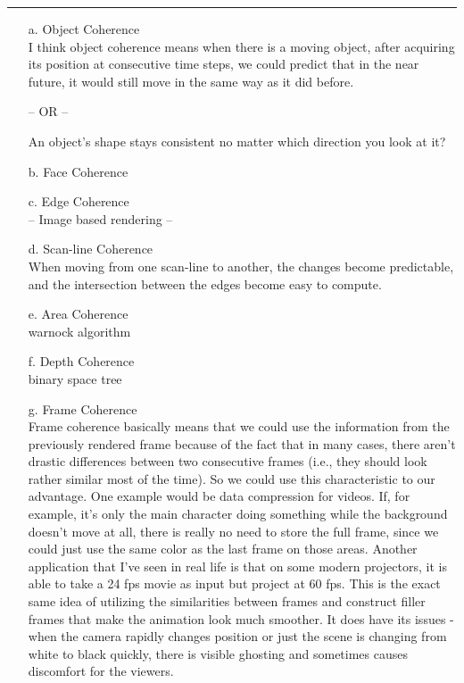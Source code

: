\documentclass[12pt]{article}
\begin{document}
\bigskip
\hrule
\bigskip
\begin{enumerate}
	\item[a.]{Object Coherence}\\
		I think object coherence means when there is a moving object, after acquiring its position at 
		consecutive time steps, we could predict that in the near future, it would still move in the same 
		way as it did before.\par
		-- OR -- \par
		An object's shape stays consistent no matter which direction you look at it?
	\item[b.]{Face Coherence}\\

	\item[c.]{Edge Coherence}\\
	--
	Image based rendering
	--
	\item[d.]{Scan-line Coherence}\\
		When moving from one scan-line to another, the changes become predictable, and the intersection
		between the edges become easy to compute.
	\item[e.]{Area Coherence}\\
	warnock algorithm
	\item[f.]{Depth Coherence}\\
	binary space tree
	\item[g.]{Frame Coherence}\\
		Frame coherence basically means that we could use the information from the previously rendered
		frame because of the fact that in many cases, there aren't drastic differences between two 
		consecutive frames (i.e., they should look rather similar most of the time). So we could use
		this characteristic to our advantage. One example would be data compression for videos. If, for
		example, it's only the main character doing something while the background doesn't move at all,
		there is really no need to store the full frame, since we could just use the same color as the 
		last frame on those areas. Another application that I've seen in real life is that on some 
		modern projectors, it is able to take a 24 fps movie as input but project at 60 fps. This is 
		the exact same idea of utilizing the similarities between frames and construct filler frames 
		that make the animation look much smoother. It does have its issues -  when the camera rapidly
		changes position or just the scene is changing from white to black quickly, there is visible 
		ghosting and sometimes causes discomfort for the viewers.
\end{enumerate}
\end{document}
